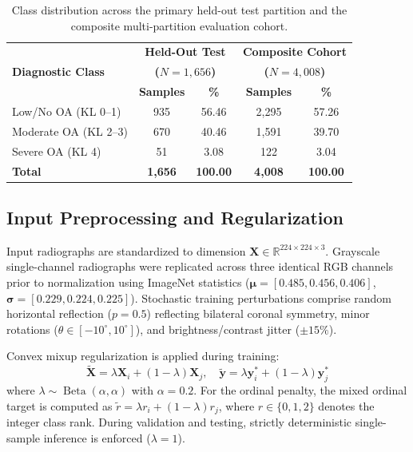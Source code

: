 \documentclass[10pt,journal]{IEEEtran}
\begin{document}
\begin{table}[t]
\centering
\caption{Class distribution across the primary held-out test partition and the composite multi-partition evaluation cohort.}
\label{tab:class_dist}
\scriptsize
\setlength{\tabcolsep}{3pt}
\renewcommand{\arraystretch}{1.15}
\begin{tabular}{lcccc}
\toprule
\multirow{3}{*}{\textbf{Diagnostic Class}} & \multicolumn{2}{c}{\textbf{Held-Out Test}} & \multicolumn{2}{c}{\textbf{Composite Cohort}} \\
 & \multicolumn{2}{c}{\textbf{($N = 1{,}656$)}} & \multicolumn{2}{c}{\textbf{($N = 4{,}008$)}} \\
\cmidrule(lr){2-3} \cmidrule(lr){4-5}
 & \textbf{Samples} & \textbf{\%} & \textbf{Samples} & \textbf{\%} \\
\midrule
Low/No OA (KL 0--1) & 935 & 56.46 & 2{,}295 & 57.26 \\
Moderate OA (KL 2--3) & 670 & 40.46 & 1{,}591 & 39.70 \\
Severe OA (KL 4) & 51 & 3.08 & 122 & 3.04 \\
\midrule
\textbf{Total} & \textbf{1,656} & \textbf{100.00} & \textbf{4,008} & \textbf{100.00} \\
\bottomrule
\end{tabular}
\end{table}

\subsection{Input Preprocessing and Regularization}
\label{subsec:preprocessing}

Input radiographs are standardized to dimension $\mathbf{X} \in \mathbb{R}^{224 \times 224 \times 3}$. Grayscale single-channel radiographs were replicated across three identical RGB channels prior to normalization using ImageNet statistics ($\bm{\mu} = [0.485, 0.456, 0.406]$, $\bm{\sigma} = [0.229, 0.224, 0.225]$). Stochastic training perturbations comprise random horizontal reflection ($p = 0.5$) reflecting bilateral coronal symmetry, minor rotations ($\theta \in [-10^\circ, 10^\circ]$), and brightness/contrast jitter ($\pm 15\%$).

Convex mixup regularization \cite{zhang2018mixup, thulasidasan2019mixup} is applied during training:
\begin{equation}
\tilde{\mathbf{X}} = \lambda \mathbf{X}_i + (1 - \lambda)\mathbf{X}_j, \quad \tilde{\mathbf{y}} = \lambda \mathbf{y}_i^* + (1 - \lambda)\mathbf{y}_j^*
\label{eq:mixup}
\end{equation}
where $\lambda \sim \operatorname{Beta}(\alpha, \alpha)$ with $\alpha = 0.2$. For the ordinal penalty, the mixed ordinal target is computed as $\tilde{r} = \lambda r_i + (1 - \lambda) r_j$, where $r \in \{0, 1, 2\}$ denotes the integer class rank. During validation and testing, strictly deterministic single-sample inference is enforced ($\lambda = 1$).
\end{document}
